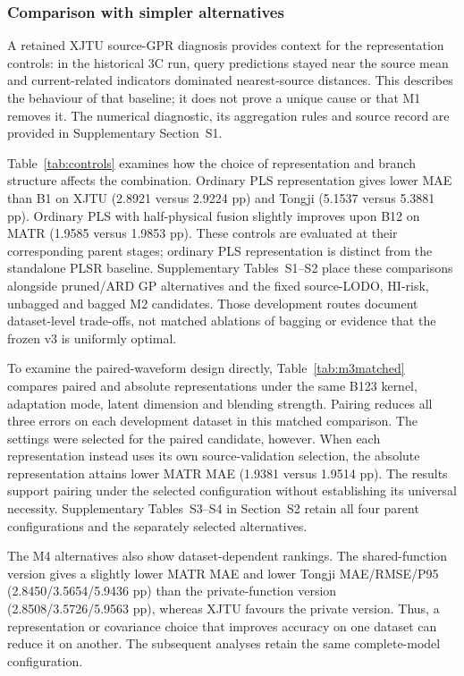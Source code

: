 \documentclass[preprint,12pt]{elsarticle}
\begin{document}
\subsubsection{Comparison with simpler alternatives}
A retained XJTU source-GPR diagnosis provides context for the representation controls: in the historical 3C run, query predictions stayed near the source mean and current-related indicators dominated nearest-source distances. This describes the behaviour of that baseline; it does not prove a unique cause or that M1 removes it. The numerical diagnostic, its aggregation rules and source record are provided in Supplementary Section~S1.

Table~\ref{tab:controls} examines how the choice of representation and branch structure affects the combination. Ordinary PLS representation gives lower MAE than B1 on XJTU (2.8921 versus 2.9224 pp) and Tongji (5.1537 versus 5.3881 pp). Ordinary PLS with half-physical fusion slightly improves upon B12 on MATR (1.9585 versus 1.9853 pp). These controls are evaluated at their corresponding parent stages; ordinary PLS representation is distinct from the standalone PLSR baseline. Supplementary Tables~S1--S2 place these comparisons alongside pruned/ARD GP alternatives and the fixed source-LODO, HI-risk, unbagged and bagged M2 candidates. Those development routes document dataset-level trade-offs, not matched ablations of bagging or evidence that the frozen v3 is uniformly optimal.



To examine the paired-waveform design directly, Table~\ref{tab:m3matched} compares paired and absolute representations under the same B123 kernel, adaptation mode, latent dimension and blending strength. Pairing reduces all three errors on each development dataset in this matched comparison. The settings were selected for the paired candidate, however. When each representation instead uses its own source-validation selection, the absolute representation attains lower MATR MAE (1.9381 versus 1.9514 pp). The results support pairing under the selected configuration without establishing its universal necessity. Supplementary Tables~S3--S4 in Section~S2 retain all four parent configurations and the separately selected alternatives.



The M4 alternatives also show dataset-dependent rankings. The shared-function version gives a slightly lower MATR MAE and lower Tongji MAE/RMSE/P95 (2.8450/3.5654/5.9436 pp) than the private-function version (2.8508/3.5726/5.9563 pp), whereas XJTU favours the private version. Thus, a representation or covariance choice that improves accuracy on one dataset can reduce it on another. The subsequent analyses retain the same complete-model configuration.
\end{document}
